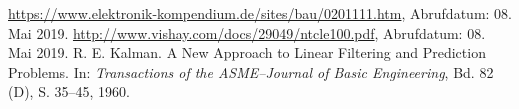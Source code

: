 \begin{thebibliography}{99}
 \url{https://www.elektronik-kompendium.de/sites/bau/0201111.htm}, Abrufdatum: 08. Mai 2019.
 \url{http://www.vishay.com/docs/29049/ntcle100.pdf}, Abrufdatum: 08. Mai 2019.
 R. E. Kalman. A New Approach to Linear Filtering and Prediction Problems. In: {\itshape Transactions of the ASME--Journal of Basic Engineering}, Bd. 82 (D), S. 35--45, 1960.
\end{thebibliography}